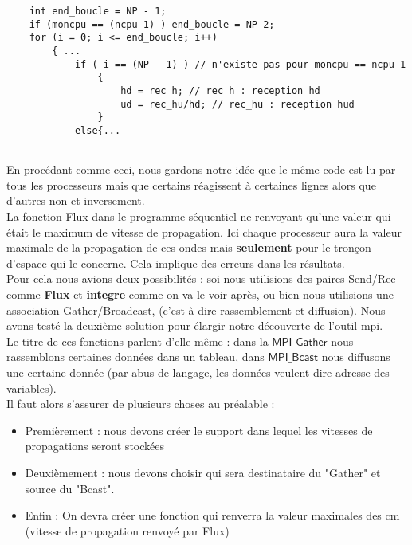 \documentclass[french]{article}
\newcommand{\cad}{c'est-à-dire}
\begin{document}
\begin{minipage}{455 pt}
\begin{lstlisting}
	int end_boucle = NP - 1;
  	if (moncpu == (ncpu-1) ) end_boucle = NP-2; 
  	for (i = 0; i <= end_boucle; i++)
  		{ ...
  		    if ( i == (NP - 1) ) // n'existe pas pour moncpu == ncpu-1
    			{
        			hd = rec_h; // rec_h : reception hd
        			ud = rec_hu/hd; // rec_hu : reception hud
    			}
    		else{...
  		
\end{lstlisting}
\end{minipage}
 
 En procédant comme ceci, nous gardons notre idée que le même code est lu par tous les processeurs mais que certains réagissent à certaines lignes alors que d'autres non et inversement.\\
 
 \noindent La fonction Flux dans le programme séquentiel ne renvoyant qu'une valeur qui était le maximum de vitesse de propagation. Ici chaque processeur aura la valeur maximale de la propagation de ces ondes mais \textbf{seulement} pour le tronçon d'espace qui le concerne. Cela implique des erreurs dans les résultats.\\
  Pour cela nous avions deux possibilités : soi nous utilisions des paires Send/Rec comme \textbf{Flux} et \textbf{integre} comme on va le voir après, ou bien nous utilisions une association Gather/Broadcast, (\cad $ $ rassemblement et diffusion). Nous avons testé la deuxième solution pour élargir notre découverte de l'outil mpi. \\
  Le titre de ces fonctions parlent d'elle même : dans la $\mathsf{MPI\_ Gather}$ nous rassemblons certaines données dans un tableau, dans $\mathsf{MPI\_ Bcast}$ nous diffusons une certaine donnée (par abus de langage, les données veulent dire adresse des variables).\\
  Il faut alors s'assurer de plusieurs choses au préalable : 
 
  \begin{itemize}
  \renewcommand{\labelitemi}{∙}
  \item \hspace{2mm} Premièrement : nous devons créer le support dans lequel les vitesses de propagations seront stockées
  \item \hspace{2mm} Deuxièmement : nous devons choisir qui sera destinataire du "Gather" et source du "Bcast".
  \item \hspace{2mm} Enfin : On devra créer une fonction qui renverra la valeur maximales des cm (vitesse de propagation renvoyé par Flux) 
  \end{itemize}
\end{document}
